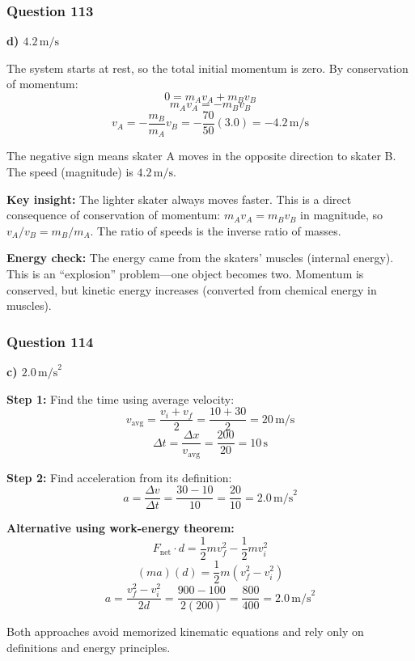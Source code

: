 \documentclass[12pt,letterpaper]{article}
\begin{document}
\subsubsection*{Question 113}

\begin{answerbox}
\textbf{d) $4.2\,\text{m/s}$}
\end{answerbox}

\begin{explanationbox}
The system starts at rest, so the total initial momentum is zero. By conservation of momentum:
\[
0 = m_A v_A + m_B v_B
\]
\[
m_A v_A = -m_B v_B
\]
\[
v_A = -\frac{m_B}{m_A} v_B = -\frac{70}{50}(3.0) = -4.2\,\text{m/s}
\]

The negative sign means skater A moves in the opposite direction to skater B. The speed (magnitude) is $4.2\,\text{m/s}$.

\textbf{Key insight:} The lighter skater always moves faster. This is a direct consequence of conservation of momentum: $m_A v_A = m_B v_B$ in magnitude, so $v_A/v_B = m_B/m_A$. The ratio of speeds is the inverse ratio of masses.

\textbf{Energy check:} The energy came from the skaters' muscles (internal energy). This is an ``explosion'' problem---one object becomes two. Momentum is conserved, but kinetic energy increases (converted from chemical energy in muscles).
\end{explanationbox}

\subsubsection*{Question 114}

\begin{answerbox}
\textbf{c) $2.0\,\text{m/s}^2$}
\end{answerbox}

\begin{explanationbox}
\textbf{Step 1:} Find the time using average velocity:
\[
v_{\text{avg}} = \frac{v_i + v_f}{2} = \frac{10 + 30}{2} = 20\,\text{m/s}
\]
\[
\Delta t = \frac{\Delta x}{v_{\text{avg}}} = \frac{200}{20} = 10\,\text{s}
\]

\textbf{Step 2:} Find acceleration from its definition:
\[
a = \frac{\Delta v}{\Delta t} = \frac{30 - 10}{10} = \frac{20}{10} = 2.0\,\text{m/s}^2
\]

\textbf{Alternative using work-energy theorem:}
\[
F_{\text{net}} \cdot d = \frac{1}{2}mv_f^2 - \frac{1}{2}mv_i^2
\]
\[
(ma)(d) = \frac{1}{2}m(v_f^2 - v_i^2)
\]
\[
a = \frac{v_f^2 - v_i^2}{2d} = \frac{900 - 100}{2(200)} = \frac{800}{400} = 2.0\,\text{m/s}^2
\]

Both approaches avoid memorized kinematic equations and rely only on definitions and energy principles.
\end{explanationbox}
\end{document}
